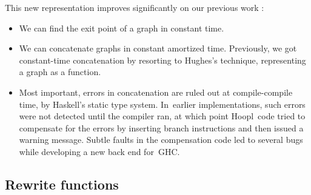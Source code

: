 \documentclass[blockstyle,preprint,natbib,nocopyrightspace]{sigplanconf}
\newcommand\ourlib{Hoopl}  %
\let\cite\citep
\def\authornote#1{\unskip\relax}
\newcommand{\simon}[1]{\authornote{SLPJ: #1}}
\newcommand\seclabel[1]{\label{sec:#1}}
\begin{document}
This new representation improves significantly on our previous work
\cite{ramsey-dias:applicative-flow-graph}:
\begin{itemize}
\item
We can find the exit point of a graph in constant time.
\item
We can concatenate graphs
in constant amortized time.
Previously, we got constant-time
concatenation by resorting to Hughes's
\citeyearpar{hughes:lists-representation} technique, representing
a graph as a function.
\item
Most important, errors in concatenation are ruled out at
compile-compile time, by Haskell's static
type system.
In~earlier implementations, such errors were not detected until
the compiler ran, at which point \ourlib\ code tried to compensate
for the errors by inserting branch instructions and then issued a warning message.
Subtle faults in the compensation code led to several bugs
while developing a new back end for~GHC.
\end{itemize}








\subsection{Rewrite functions}
\seclabel{rewrite-functions}
\end{document}
